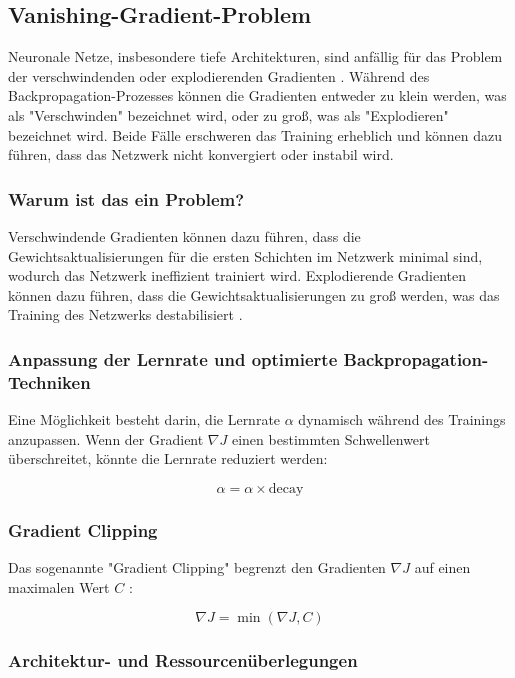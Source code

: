 \subsection{Vanishing-Gradient-Problem}

Neuronale Netze, insbesondere tiefe Architekturen, sind anfällig für das Problem der verschwindenden oder explodierenden Gradienten \cite{aggarwal_neural_networks_2018}. 
Während des Backpropagation-Prozesses können die Gradienten entweder zu klein werden, was als "Verschwinden" bezeichnet wird, oder zu groß, was als "Explodieren" bezeichnet wird. Beide Fälle erschweren das Training erheblich und können dazu führen, dass das Netzwerk nicht konvergiert oder instabil wird.

\subsubsection{Warum ist das ein Problem?}

Verschwindende Gradienten können dazu führen, dass die Gewichtsaktualisierungen für die ersten Schichten im Netzwerk minimal sind, wodurch das Netzwerk ineffizient trainiert wird. 
Explodierende Gradienten können dazu führen, dass die Gewichtsaktualisierungen zu groß werden, was das Training des Netzwerks destabilisiert \cite{aggarwal_neural_networks_2018}.

\subsubsection{Anpassung der Lernrate und optimierte Backpropagation-Techniken}

Eine Möglichkeit besteht darin, die Lernrate \( \alpha \) dynamisch während des Trainings anzupassen. Wenn der Gradient \( \nabla J \) einen bestimmten Schwellenwert überschreitet, könnte die Lernrate reduziert werden:

\[
\alpha = \alpha \times \text{decay}
\]

\subsubsection{Gradient Clipping}

Das sogenannte "Gradient Clipping" begrenzt den Gradienten \( \nabla J \) auf einen maximalen Wert \( C \) \cite{brunton2019data}:

\[
\nabla J = \min(\nabla J, C)
\]

\subsubsection{Architektur- und Ressourcenüberlegungen}

